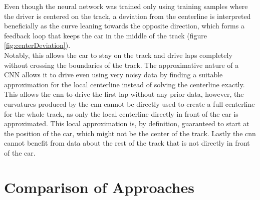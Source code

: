 Even though the neural network was trained only using training samples where the driver is centered on the track, a deviation from the centerline is interpreted beneficially as the curve leaning towards the opposite direction, which forms a feedback loop that keeps the car in the middle of the track (figure \ref{fig:centerDeviation}).
\\Notably, this allows the car to stay on the track and drive laps completely without crossing the boundaries of the track. The approximative nature of a CNN allows it to drive even using very noisy data by finding a suitable approximation for the local centerline instead of solving the centerline exactly. This allows the \ac{cnn} to drive the first lap without any prior data, however, the curvatures produced by the \ac{cnn} cannot be directly used to create a full centerline for the whole track, as only the local centerline directly in front of the car is approximated. This local approximation is, by definition, guaranteed to start at the position of the car, which might not be the center of the track. Lastly the \ac{cnn} cannot benefit from data about the rest of the track that is not directly in front of the car.


\section{Comparison of Approaches}

